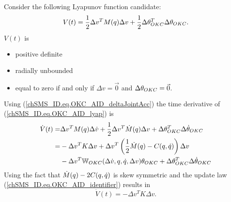 Consider the following Lyapunov function candidate:
%
\begin{equation}\label{chSMS_ID.eq.OKC_AID_lyap}
V(t)=\frac{1}{2}\Delta v^{T} M(q) \Delta v + 
     \frac{1}{2}\Delta \theta_{OKC}^{T} \Delta \theta_{OKC}.
\end{equation}
%
$V(t)$ is
%
\begin{itemize}
\item positive definite
\item radially unbounded
\item equal to zero if and only if $\Delta v=\vec{0}$ and
$\Delta \theta_{OKC}=\vec{0}$.
\end{itemize}
%
Using (\ref{chSMS_ID.eq.OKC_AID_deltaJointAcc}) the time derivative of
(\ref{chSMS_ID.eq.OKC_AID_lyap}) is
%
\begin{align*}
\dot{V}(t)
  =&\Delta v^{T} M(\OKCpos) \Delta \dot{v} 
    +\frac{1}{2}\Delta v^{T} \dot{M}(\OKCpos) \Delta v 
    +\Delta \OKCparam^{T} \Delta \OKCparamDot \nonumber \\
  =&-\Delta v^{T} K \Delta v
    +\Delta v^{T}\left(\frac{1}{2}\dot{M}(\OKCpos)-C(\OKCpos,\dot{\OKCpos})\right)\Delta v
                                          \nonumber \\
   &-\Delta v^{T} \OKCreg(\Delta \dot{v},\OKCpos,\dot{\OKCpos},\Delta v)\OKCparam
    +\Delta \OKCparam^{T} \Delta \OKCparamDot %
\end{align*}
%
Using the fact that $\dot{M}(q)-2C(q,\dot{q})$ is skew
symmetric and the update law (\ref{chSMS_ID.eq.OKC_AID_identifier}) results in
%
\begin{equation}\label{chSMS_ID.eq.OKC_AID_lyapDot}
\dot{V}(t)=-\Delta v^{T} K \Delta v.
\end{equation} 
%
%
